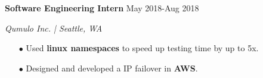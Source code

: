 \documentclass[paper=a4,fontsize=10pt]{scrartcl} %
\newcommand{\sepspace}{\vspace*{1em}}		%
\newcommand{\EducationEntry}[4]{
		\noindent \textbf{#1}     %
			\hfill#2 \par  %
		\noindent \textit{#3} \par        %
		\noindent\hangafter=0 \small #4 %
		\normalsize \par}
\begin{document}
\begin{minipage}[t]{0.75\textwidth}
\EducationEntry{Software Engineering Intern}{May 2018-Aug 2018}{Qumulo Inc. | Seattle, WA}{
\begin{itemize}
  \item[$\bullet$] Used \textbf{linux namespaces} to speed up testing time by up to 5x.
  \item[$\bullet$] Designed and developed a IP failover in \textbf{AWS}.
\end{itemize}
}
\sepspace





\end{minipage}
\end{document}
